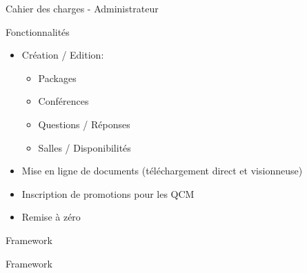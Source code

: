 \begin{frame}{Cahier des charges - Administrateur}
    \begin{block}{Fonctionnalités}
    \begin{itemize}
    \item Création / Edition:
            \begin{itemize}
            \item Packages
            \item Conférences
            \item Questions / Réponses
            \item Salles / Disponibilités
            \end{itemize}
    \item Mise en ligne de documents (téléchargement direct et visionneuse)
    \item Inscription de promotions pour les QCM
    \item Remise à zéro
    \end{itemize}
    \end{block}
\end{frame}

\begin{frame}{Framework}
    \begin{block}{Framework}
    
    \end{block}
\end{frame}
